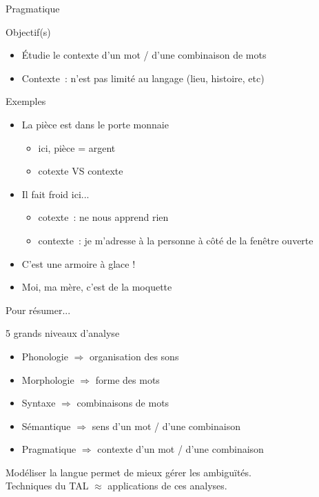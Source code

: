\documentclass[serif, aspectratio=169]{beamer}
\begin{document}
\begin{frame}{Pragmatique}
    \pause
    \begin{block}{Objectif(s)}
        \begin{itemize}
            \item Étudie le contexte d'un mot / d'une combinaison de mots
            \item Contexte~: n'est pas limité au langage (lieu, histoire, etc)
        \end{itemize}
    \end{block}
    \begin{block}{Exemples}
        \begin{itemize}
            \item La pièce est dans le porte monnaie
            \begin{itemize}
                \item ici, pièce = argent
                \item cotexte VS contexte
            \end{itemize}
            \item Il fait froid ici...
            \begin{itemize}
                \item cotexte~: ne nous apprend rien
                \item contexte~: je m'adresse à la personne à côté de la fenêtre ouverte
            \end{itemize}
            \item C'est une armoire à glace !
            \item Moi, ma mère, c'est de la moquette
        \end{itemize}
    \end{block}
\end{frame}

\begin{frame}{Pour résumer...}
    \begin{block}{5 grands niveaux d'analyse}
        \begin{itemize}
            \item Phonologie $\Rightarrow$ organisation des sons
            \item Morphologie $\Rightarrow$ forme des mots
            \item Syntaxe $\Rightarrow$ combinaisons de mots
            \item Sémantique $\Rightarrow$ sens d'un mot / d'une combinaison
            \item Pragmatique $\Rightarrow$ contexte d'un mot / d'une combinaison
        \end{itemize}
    \end{block}
    \vspace{10pt}
    \begin{center}
        \Large
        \pause
        Modéliser la langue permet de mieux gérer les ambiguïtés. \\
        \pause
        Techniques du TAL $\approx$ applications de ces analyses.
    \end{center}
\end{frame}
\end{document}
